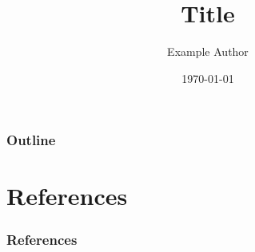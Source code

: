 \documentclass{beamer}
\title{Title}
\author{Example Author}
\institute{Example University\\Department of Mathematics}
\date{\today}
\begin{document}
\frame{\titlepage}

\begin{frame}
    \frametitle{Outline}
    \tableofcontents
\end{frame}

\section{References}

\begin{frame}[allowframebreaks]
    \frametitle{References}
    \printbibliography
\end{frame}
\end{document}
